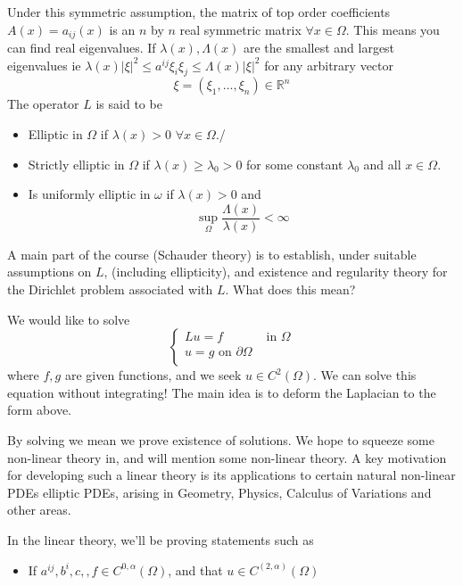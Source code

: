 Under this symmetric assumption, 
the matrix of top order coefficients $ A \left(  x  \right)   = a _{ ij } \left(  x  \right)  $ 
is an $ n $ by $ n $ real symmetric matrix $ \forall x \in \Omega $. 
This means you can find real eigenvalues. 
If $ \lambda \left(  x  \right)  , \Lambda \left(  x  \right)  $ are 
the smallest and largest eigenvalues ie $ \lambda ( x) | \xi | ^ 2 \leq a^{ ij } \xi _ i \xi_ j 
\leq \Lambda \left(  x  \right)  | \xi | ^ 2  $ for any arbitrary vector 
\[
	\xi  = ( \xi_1 , \dots , \xi_ n ) \in \mathbb{ R } ^{ n } 
\] 
The operator  $ L  $ is said to be
\begin{itemize}
	\item Elliptic in $ \Omega $ if $ \lambda (x ) >  0 $  $ \forall x \in \Omega $./ 
	\item Strictly elliptic in $ \Omega $ if $ \lambda (x  ) \geq \lambda _ 0 > 0 $
	for some constant  $ \lambda_0 $ and all $ x \in \Omega $. 
\item Is uniformly elliptic in  $ \omega $ if $ \lambda ( x) > 0 $ and 
	\[
		\sup_{ \Omega } \frac{\Lambda \left( x  \right)  }{ \lambda (x )} < \infty 
	\] 
\end{itemize}
A main part of the course (Schauder theory) is to establish, 
under suitable assumptions on $ L $, (including ellipticity), 
and existence and regularity theory for the Dirichlet problem associated with $  L $. 
What does this mean? 

We would like to solve 
\[
 \begin{cases}
	 L u = f & \text{ in } \Omega \\ 
	 u = g \text{ on } \partial  \Omega \\ 
 \end{cases}
\] where $ f , g $ are given functions, and we seek $ u \in C ^ 2 \left(  \Omega  \right) $.
We can solve this equation without integrating! 
The main idea is to deform the Laplacian to the form above. 

By solving we mean we prove existence of solutions. 
We hope to squeeze some non-linear theory in, and will mention some non-linear theory.
A key motivation for 
developing such a linear theory is its applications 
to certain natural non-linear PDEs elliptic PDEs, 
arising in Geometry, Physics, 
Calculus of Variations and other areas. 

In the linear theory, 
we'll be proving statements such as 
\begin{itemize}
	\item If $ a ^{ ij }, b ^ i, c, ,f   \in C ^{ 0 , \alpha } \left( \Omega  \right)  $, 
		and that $ u \in C ^ \left( 2, \alpha  \right)  \left( \Omega \right) $
\end{itemize}


